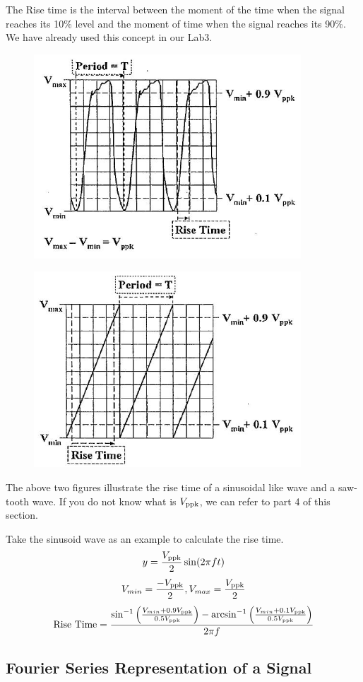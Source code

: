 \documentclass[a4paper]{report}
\begin{document}
The Rise time is the interval between the moment of the time when the signal reaches its 10\% level and the moment of time when the signal reaches its 90\%. We have already used this concept in our Lab3.
\begin{figure}[H]
	\centering
	\includegraphics[width=10cm]{2.jpg}
\end{figure}
\begin{figure}[H]
	\centering
	\includegraphics[width=10cm]{3.jpg}
\end{figure}
The above two figures illustrate the rise time of a sinusoidal like wave and a saw-tooth wave. If you do not know what is $V_{\rm{ppk}}$, we can refer to part 4 of this section.

Take the sinusoid wave as an example to calculate the rise time.
$$y=\frac{V_{\rm{ppk}}}{2}\sin(2\pi ft)$$
$$V_{min}=\frac{-V_{\rm{ppk}}}{2},V_{max}=\frac{V_{\rm{ppk}}}{2}$$
$$\mathrm{Rise\ Time}=\frac{\sin^{-1}\left(\frac{V_{min}+0.9V_{\rm{ppk}}}{0.5V_{\rm{ppk}}}\right)-\arcsin^{-1}\left(\frac{V_{min}+0.1V_{\rm{ppk}}}{0.5V_{\rm{ppk}}}\right)}{2\pi f}$$
\subsection{Fourier Series Representation of a Signal}
\end{document}
